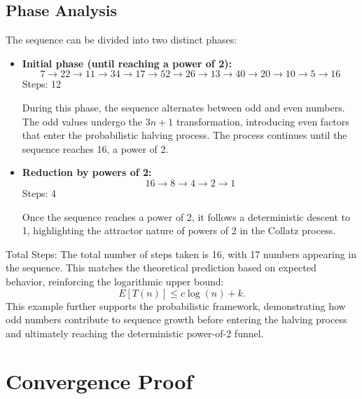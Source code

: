 \documentclass{article}
\begin{document}
\subsection{Phase Analysis}
The sequence can be divided into two distinct phases:
\begin{itemize}
    \item \textbf{Initial phase (until reaching a power of 2):}
    \[
    7 \rightarrow 22 \rightarrow 11 \rightarrow 34 \rightarrow 17 \rightarrow 52 \rightarrow 26 \rightarrow 13 \rightarrow 40 \rightarrow 20 \rightarrow 10 \rightarrow 5 \rightarrow 16
    \]
    Steps: 12

    During this phase, the sequence alternates between odd and even numbers. The odd values undergo the $3n + 1$ transformation, introducing even factors that enter the probabilistic halving process. The process continues until the sequence reaches 16, a power of 2.
    
    \item \textbf{Reduction by powers of 2:}
    \[
    16 \rightarrow 8 \rightarrow 4 \rightarrow 2 \rightarrow 1
    \]
    Steps: 4

    Once the sequence reaches a power of 2, it follows a deterministic descent to 1, highlighting the attractor nature of powers of 2 in the Collatz process.
\end{itemize}
Total Steps: The total number of steps taken is 16, with 17 numbers appearing in the sequence. This matches the theoretical prediction based on expected behavior, reinforcing the logarithmic upper bound:
\[
E[T(n)] \leq c \log(n) + k.
\]
This example further supports the probabilistic framework, demonstrating how odd numbers contribute to sequence growth before entering the halving process and ultimately reaching the deterministic power-of-2 funnel.

\section{Convergence Proof}
\end{document}
